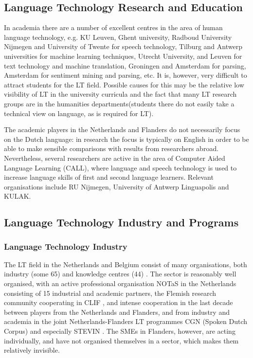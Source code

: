 \documentclass[]{../../metanetpaper}
\begin{document}
\begin{multicols}{2}
\subsection{Language Technology Research and Education}

    In academia there are a number of excellent centres in the area of human language technology, e.g.  KU Leuven, Ghent university, Radboud University Nijmegen and University of Twente for speech technology, Tilburg and Antwerp universities for machine learning techniques, Utrecht University, and Leuven for text technology and machine translation, Groningen and Amsterdam for parsing, Amsterdam for sentiment mining and parsing, etc. It is, however, very difficult to attract students for the LT field. Possible causes for this may be the relative low visibility of LT in the university curricula and the fact that many LT research groups are in the humanities departments(students there do not easily take a technical view on language, as is required for LT).

    The academic players in the Netherlands and Flanders do not necessarily focus on the Dutch language: in research the focus is typically on English in order to be able to make sensible comparisons with results from researchers abroad. Nevertheless, several researchers are active in the area of Computer Aided Language Learning (CALL), where language and speech technology is used to increase language skills of first and second language learners. Relevant organisations include RU Nijmegen, University of Antwerp Linguapolis and KULAK.

\subsection{Language Technology Industry and Programs}

  \subsubsection{Language Technology Industry}

 The LT field in the Netherlands and Belgium consist of many organisations, both industry (some 65) and knowledge centres (44) \cite{Orgs}.  The sector is reasonably well organised, with an active professional organisation NOTaS \cite{NOTAS} in the Netherlands consisting of 15 industrial and academic partners, the Flemish research community cooperating in CLIF \cite{CLIF}, and intense cooperation in the last decade between players from the Netherlands and Flanders, and from industry and academia in the joint Netherlands-Flanders LT programmes CGN (Spoken Dutch Corpus) \cite{CGN} and especially STEVIN \cite{STEVIN}. The SMEs in Flanders, however, are acting individually, and have not organised themselves in a sector, which makes them relatively invisible.


\end{multicols}
\end{document}
